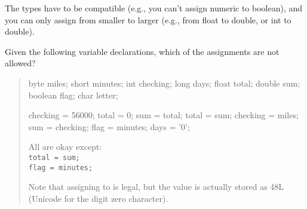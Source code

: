 \vspace{-1em}
\begin{answer}
The types have to be compatible (e.g., you can't assign numeric to boolean), and you can only assign from smaller to larger (e.g., from float to double, or int to double).
\end{answer}


\Q Given the following variable declarations, which of the assignments are not allowed?

\begin{quote}
\begin{multicols}{3}

\begin{javalst}
byte miles;
short minutes;
int checking;
long days;
float total;
double sum;
boolean flag;
char letter;
\end{javalst}

\columnbreak

\begin{javalst}
checking = 56000;
total = 0;
sum = total;
total = sum;
checking = miles;
sum = checking;
flag = minutes;
days = '0';
\end{javalst}

\columnbreak

\begin{answer}[10em]
All are okay except:
\\ \hspace*{1em} \texttt{total = sum;}
\\ \hspace*{1em} \texttt{flag = minutes;}

\medskip
Note that assigning  to  is legal,
but the value is actually stored as 48L (Unicode for the digit zero character).
\end{answer}

\end{multicols}
\end{quote}


%
